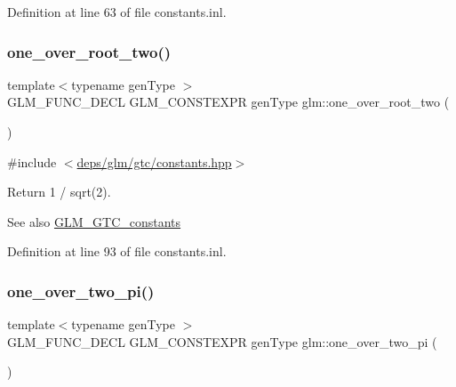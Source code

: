 Definition at line 63 of file constants.\+inl.

\mbox{\label{group__gtc__constants_ga788fa23a0939bac4d1d0205fb4f35818}} 
\subsubsection{\texorpdfstring{one\+\_\+over\+\_\+root\+\_\+two()}{one\_over\_root\_two()}}
{\footnotesize\ttfamily template$<$typename gen\+Type $>$ \\
G\+L\+M\+\_\+\+F\+U\+N\+C\+\_\+\+D\+E\+CL G\+L\+M\+\_\+\+C\+O\+N\+S\+T\+E\+X\+PR gen\+Type glm\+::one\+\_\+over\+\_\+root\+\_\+two (\begin{DoxyParamCaption}{ }\end{DoxyParamCaption})}



{\ttfamily \#include $<$\hyperlink{constants_8hpp}{deps/glm/gtc/constants.\+hpp}$>$}

Return 1 / sqrt(2). \begin{DoxySeeAlso}{See also}
\hyperlink{group__gtc__constants}{G\+L\+M\+\_\+\+G\+T\+C\+\_\+constants} 
\end{DoxySeeAlso}


Definition at line 93 of file constants.\+inl.

\mbox{\label{group__gtc__constants_ga7c922b427986cbb2e4c6ac69874eefbc}} 
\subsubsection{\texorpdfstring{one\+\_\+over\+\_\+two\+\_\+pi()}{one\_over\_two\_pi()}}
{\footnotesize\ttfamily template$<$typename gen\+Type $>$ \\
G\+L\+M\+\_\+\+F\+U\+N\+C\+\_\+\+D\+E\+CL G\+L\+M\+\_\+\+C\+O\+N\+S\+T\+E\+X\+PR gen\+Type glm\+::one\+\_\+over\+\_\+two\+\_\+pi (\begin{DoxyParamCaption}{ }\end{DoxyParamCaption})}



